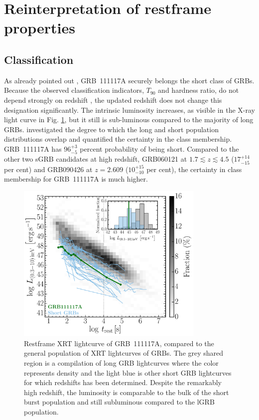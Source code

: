 \documentclass{aa}    %
\begin{document}
\section{Reinterpretation of restframe properties}


\subsection{Classification}

As already pointed out \citep{Margutti2012, Sakamoto2013}, GRB~111117A securely 
belongs the short class of GRBs. Because the observed classification
indicators, $T_{90}$ and hardness ratio, do not depend strongly on redshift
\citep{Littlejohns2013a}, the updated redshift does not change this designation
significantly. The intrinsic luminosity increases, as visible in the X-ray light curve
in Fig. \ref{fig:sxray_lightcurve}, but it still is sub-luminous compared to
the majority of long GRBs. \citet{Bromberg2013} investigated the degree to which the
long and short population distributions overlap and quantified the certainty in
the class membership. GRB~111117A has $96_{-5}^{+3}$ percent probability of
being short. Compared to the other two sGRB candidates at high redshift, GRB060121
\citep{DeUgartePostigo2006, Levan2006} at $1.7 \lesssim z \lesssim 4.5$
($17_{-15}^{+14}$ per cent) and GRB090426 \citep{Antonelli2009, Levesque2010,
	Thone2011} at $z = 2.609$ ($10_{-10}^{+15}$ per cent), the certainty in class
membership for GRB~111117A is much higher.

\begin{figure}
	\centering
	\includegraphics[width=9cm]{figures/XLC_111117A_rest.pdf}
	\caption{Restframe XRT lightcurve of GRB~111117A, compared to the general population of XRT lightcurves of GRBs. The grey shared region is a compilation of long GRB lightcurves where the color represents density and the light blue is other short GRB lightcurves for which redshifts has been determined. Despite the remarkably high redshift, the luminosity is comparable to the bulk of the short burst population and still subluminous compared to the lGRB population.}
	\label{fig:sxray_lightcurve}
\end{figure}
\end{document}
